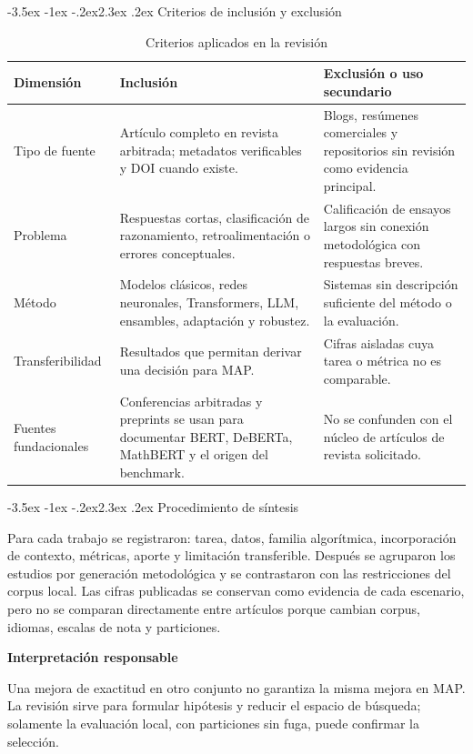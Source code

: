 \documentclass[11pt,oneside,openany]{book}
\makeatletter
\renewcommand\section{\@startsection{section}{1}{\z@}%
  {-3.5ex \@plus -1ex \@minus -.2ex}{2.3ex \@plus .2ex}%
  {\normalfont\Large\sffamily\bfseries\color{AzulMedio}}}
\newenvironment{advertencia}[1][]{%
  \begin{lrbox}{\infobox}\begin{minipage}{0.92\textwidth}
  \color{GrisTexto}\sffamily\textbf{#1}\par\smallskip\rmfamily}
  {\end{minipage}\end{lrbox}\par\medskip\noindent
   \colorbox{AmarilloClaro}{\usebox{\infobox}}\par\medskip}
\makeatother
\begin{document}
\section{Criterios de inclusión y exclusión}

\begin{table}[H]
\centering
\caption{Criterios aplicados en la revisión}
\label{tab:criterios-revision}
\begin{tabularx}{\textwidth}{@{}P{3.2cm}YY@{}}
\toprule
\textbf{Dimensión} & \textbf{Inclusión} & \textbf{Exclusión o uso secundario}\\
\midrule
Tipo de fuente & Artículo completo en revista arbitrada; metadatos verificables y
DOI cuando existe. & Blogs, resúmenes comerciales y repositorios sin revisión como
evidencia principal.\\
Problema & Respuestas cortas, clasificación de razonamiento, retroalimentación o
errores conceptuales. & Calificación de ensayos largos sin conexión metodológica
con respuestas breves.\\
Método & Modelos clásicos, redes neuronales, Transformers, LLM, ensambles,
adaptación y robustez. & Sistemas sin descripción suficiente del método o la
evaluación.\\
Transferibilidad & Resultados que permitan derivar una decisión para MAP. & Cifras
aisladas cuya tarea o métrica no es comparable.\\
Fuentes fundacionales & Conferencias arbitradas y preprints se usan para documentar
BERT, DeBERTa, MathBERT y el origen del benchmark. & No se confunden con el núcleo
de artículos de revista solicitado.\\
\bottomrule
\end{tabularx}
\end{table}

\section{Procedimiento de síntesis}

Para cada trabajo se registraron: tarea, datos, familia algorítmica, incorporación
de contexto, métricas, aporte y limitación transferible. Después se agruparon los
estudios por generación metodológica y se contrastaron con las restricciones del
corpus local. Las cifras publicadas se conservan como evidencia de cada escenario,
pero no se comparan directamente entre artículos porque cambian corpus, idiomas,
escalas de nota y particiones.

\begin{advertencia}[Interpretación responsable]
Una mejora de exactitud en otro conjunto no garantiza la misma mejora en MAP. La
revisión sirve para formular hipótesis y reducir el espacio de búsqueda; solamente
la evaluación local, con particiones sin fuga, puede confirmar la selección.
\end{advertencia}
\end{document}
